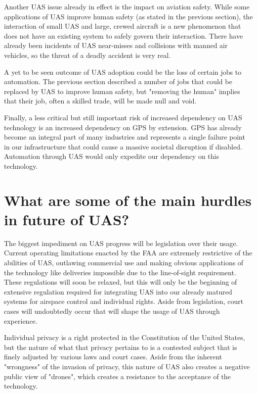 \documentclass[]{aiaa-tc}%
\begin{document}
Another UAS issue already in effect is the impact on aviation safety.  While some applications of UAS improve human safety (as stated in the previous section), the interaction of small UAS and large, crewed aircraft is a new phenomenon that does not have an existing system to safely govern their interaction.  There have already been incidents of UAS near-misses and collisions with manned air vehicles, so the threat of a deadly accident is very real.

A yet to be seen outcome of UAS adoption could be the loss of certain jobs to automation.  The previous section described a number of jobs that could be replaced by UAS to improve human safety, but "removing the human" implies that their job, often a skilled trade, will be made null and void.

Finally, a less critical but still important risk of increased dependency on UAS technology is an increased dependency on GPS by extension.  GPS has already become an integral part of many industries and represents a single failure point in our infrastructure that could cause a massive societal disruption if disabled.  Automation through UAS would only expedite our dependency on this technology.





\section*{What are some of the main hurdles in future of UAS?}

The biggest impediment on UAS progress will be legislation over their usage.  Current operating limitations enacted by the FAA are extremely restrictive of the abilities of UAS, outlawing commercial use and making obvious applications of the technology like deliveries impossible due to the line-of-sight requirement.  These regulations will soon be relaxed, but this will only be the beginning of extensive regulation required for integrating UAS into our already matured systems for airspace control and individual rights.  Aside from legislation, court cases will undoubtedly occur that will shape the usage of UAS through experience.

Individual privacy is a right protected in the Constitution of the United States, but the nature of what that privacy pertains to is a contested subject that is finely adjusted by various laws and court cases.  Aside from the inherent "wrongness" of the invasion of privacy, this nature of UAS also creates a negative public view of "drones", which creates a resistance to the acceptance of the technology.
\end{document}
